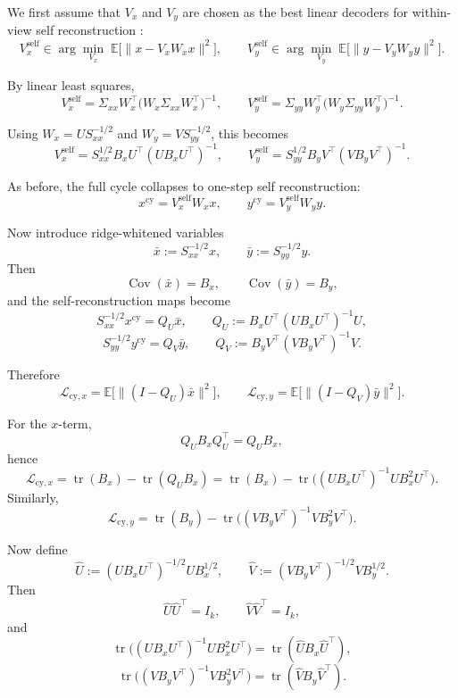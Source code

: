 \documentclass{article}
\begin{document}
We first assume that \(V_x\) and \(V_y\) are chosen as the best linear
decoders for within-view self reconstruction :
\[
V_x^{\mathrm{self}}
\in
\arg\min_{V_x}\;
\mathbb E\bigl[\|x - V_x W_x x\|^2\bigr],
\qquad
V_y^{\mathrm{self}}
\in
\arg\min_{V_y}\;
\mathbb E\bigl[\|y - V_y W_y y\|^2\bigr].
\]

By linear least squares,
\[
V_x^{\mathrm{self}}
=
\Sigma_{xx}W_x^\top\bigl(W_x\Sigma_{xx}W_x^\top\bigr)^{-1},
\qquad
V_y^{\mathrm{self}}
=
\Sigma_{yy}W_y^\top\bigl(W_y\Sigma_{yy}W_y^\top\bigr)^{-1}.
\]

Using \(W_x = U S_{xx}^{-1/2}\) and \(W_y = V S_{yy}^{-1/2}\), this becomes
\[
V_x^{\mathrm{self}}
=
S_{xx}^{1/2} B_x U^\top (U B_x U^\top)^{-1},
\qquad
V_y^{\mathrm{self}}
=
S_{yy}^{1/2} B_y V^\top (V B_y V^\top)^{-1}.
\]

As before, the full cycle collapses to one-step self reconstruction:
\[
x^{\mathrm{cy}} = V_x^{\mathrm{self}} W_x x,
\qquad
y^{\mathrm{cy}} = V_y^{\mathrm{self}} W_y y.
\]

Now introduce ridge-whitened variables
\[
\bar x := S_{xx}^{-1/2}x,
\qquad
\bar y := S_{yy}^{-1/2}y.
\]
Then
\[
\operatorname{Cov}(\bar x)=B_x,
\qquad
\operatorname{Cov}(\bar y)=B_y,
\]
and the self-reconstruction maps become
\[
S_{xx}^{-1/2}x^{\mathrm{cy}}
=
Q_U \bar x,
\qquad
Q_U := B_x U^\top (U B_x U^\top)^{-1} U,
\]
\[
S_{yy}^{-1/2}y^{\mathrm{cy}}
=
Q_V \bar y,
\qquad
Q_V := B_y V^\top (V B_y V^\top)^{-1} V.
\]

Therefore
\[
\mathcal L_{\mathrm{cy},x}
=
\mathbb E\bigl[\|(I-Q_U)\bar x\|^2\bigr],
\qquad
\mathcal L_{\mathrm{cy},y}
=
\mathbb E\bigl[\|(I-Q_V)\bar y\|^2\bigr].
\]

For the \(x\)-term,
\[
Q_U B_x Q_U^\top = Q_U B_x,
\]
hence
\[
\mathcal L_{\mathrm{cy},x}
=
\operatorname{tr}(B_x)-\operatorname{tr}(Q_U B_x)
=
\operatorname{tr}(B_x)
-
\operatorname{tr}\!\bigl((U B_x U^\top)^{-1} U B_x^2 U^\top\bigr).
\]
Similarly,
\[
\mathcal L_{\mathrm{cy},y}
=
\operatorname{tr}(B_y)
-
\operatorname{tr}\!\bigl((V B_y V^\top)^{-1} V B_y^2 V^\top\bigr).
\]

Now define
\[
\widehat U := (U B_x U^\top)^{-1/2} U B_x^{1/2},
\qquad
\widehat V := (V B_y V^\top)^{-1/2} V B_y^{1/2}.
\]
Then
\[
\widehat U \widehat U^\top = I_k,
\qquad
\widehat V \widehat V^\top = I_k,
\]
and
\[
\operatorname{tr}\!\bigl((U B_x U^\top)^{-1} U B_x^2 U^\top\bigr)
=
\operatorname{tr}(\widehat U B_x \widehat U^\top),
\]
\[
\operatorname{tr}\!\bigl((V B_y V^\top)^{-1} V B_y^2 V^\top\bigr)
=
\operatorname{tr}(\widehat V B_y \widehat V^\top).
\]
\end{document}
